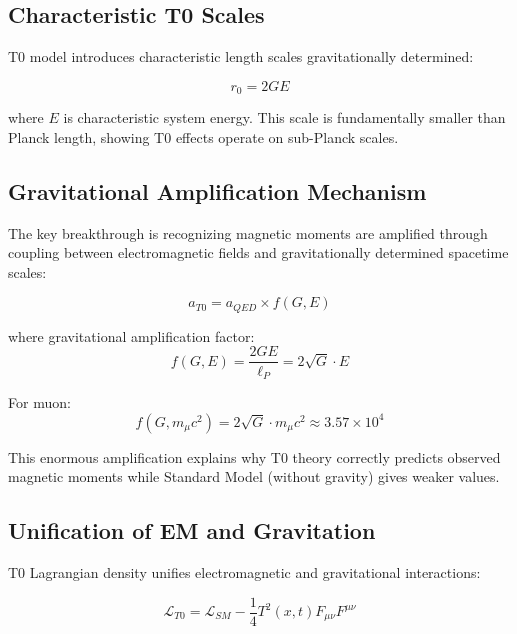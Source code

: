 \documentclass[12pt,a4paper]{article}
\theoremstyle{definition}
\begin{document}
	\subsection{Characteristic T0 Scales}
	
	T0 model introduces characteristic length scales gravitationally determined:
	
	\begin{equation}
		r_0 = 2GE
	\end{equation}
	
	where $E$ is characteristic system energy. This scale is fundamentally smaller than Planck length, showing T0 effects operate on sub-Planck scales.
	
	\subsection{Gravitational Amplification Mechanism}
	
	The key breakthrough is recognizing magnetic moments are amplified through coupling between electromagnetic fields and gravitationally determined spacetime scales:
	
	\begin{equation}
		a_{T0} = a_{QED} \times f(G, E)
	\end{equation}
	
	where gravitational amplification factor:
	\begin{equation}
		f(G, E) = \frac{2GE}{\ell_P} = 2\sqrt{G} \cdot E
	\end{equation}
	
	For muon:
	\begin{equation}
		f(G, m_\mu c^2) = 2\sqrt{G} \cdot m_\mu c^2 \approx 3.57 \times 10^4
	\end{equation}
	
	This enormous amplification explains why T0 theory correctly predicts observed magnetic moments while Standard Model (without gravity) gives weaker values.
	
	\subsection{Unification of EM and Gravitation}
	
	T0 Lagrangian density unifies electromagnetic and gravitational interactions:
	
	\begin{equation}
		\mathcal{L}_{T0} = \mathcal{L}_{SM} - \frac{1}{4}T^2(x,t) F_{\mu\nu} F^{\mu\nu}
	\end{equation}
	
\end{document}

